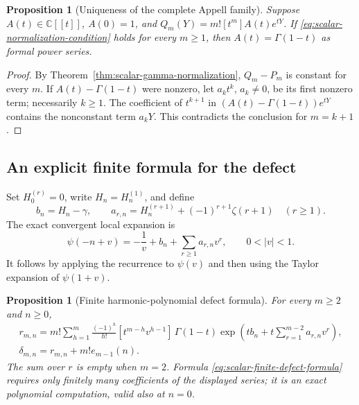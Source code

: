 \documentclass[11pt,a4paper]{article}
\numberwithin{equation}{section}
\newtheorem{proposition}[theorem]{Proposition}
\theoremstyle{definition}
\begin{document}
\begin{proposition}[Uniqueness of the complete Appell family]
\label{prop:scalar-appell-family-uniqueness}
Suppose $A(t)\in\mathbb C[[t]]$, $A(0)=1$, and
$Q_m(Y)=m![t^m]A(t)e^{tY}$.  If
\eqref{eq:scalar-normalization-condition} holds for every $m\geq1$,
then $A(t)=\Gamma(1-t)$ as formal power series.
\end{proposition}

\begin{proof}
By Theorem~\ref{thm:scalar-gamma-normalization},
$Q_m-P_m$ is constant for every $m$.  If
$A(t)-\Gamma(1-t)$ were nonzero, let $a_k t^k$, $a_k\ne0$,
be its first nonzero term; necessarily $k\geq1$.  The coefficient
of $t^{k+1}$ in
$(A(t)-\Gamma(1-t))e^{tY}$ contains the nonconstant term
$a_kY$.  This contradicts the conclusion for $m=k+1$.
\end{proof}

\subsection{An explicit finite formula for the defect}

Set $H_0^{(r)}=0$, write $H_n=H_n^{(1)}$, and define
\begin{equation}
 b_n=H_n-\gamma,\qquad
 a_{r,n}=H_n^{(r+1)}+(-1)^{r+1}\zeta(r+1)\quad(r\geq1).
 \label{eq:scalar-local-coefficients}
\end{equation}
The exact convergent local expansion is
\begin{equation}
 \psi(-n+v)=-\frac1v+b_n+\sum_{r\geq1}a_{r,n}v^r,
                         \qquad0<|v|<1.
 \label{eq:scalar-digamma-laurent}
\end{equation}
It follows by applying the recurrence to $\psi(v)$ and then using
the Taylor expansion of $\psi(1+v)$.

\begin{proposition}[Finite harmonic-polynomial defect formula]
\label{prop:scalar-finite-defect}
For every $m\geq2$ and $n\geq0$,
\begin{equation}
 \begin{aligned}
 r_{m,n}=m!\sum_{h=1}^{m}\frac{(-1)^h}{h!}
 [t^{m-h}v^{h-1}]\,
 \Gamma(1-t)
 \exp\left(tb_n+t\sum_{r=1}^{m-2}a_{r,n}v^r\right),\\
 \delta_{m,n}=r_{m,n}+m!e_{m-1}(n).
 \end{aligned}
 \label{eq:scalar-finite-defect-formula}
\end{equation}
The sum over $r$ is empty when $m=2$.  Formula
\eqref{eq:scalar-finite-defect-formula} requires only finitely
many coefficients of the displayed series; it is an exact
polynomial computation, valid also at $n=0$.
\end{proposition}
\end{document}
